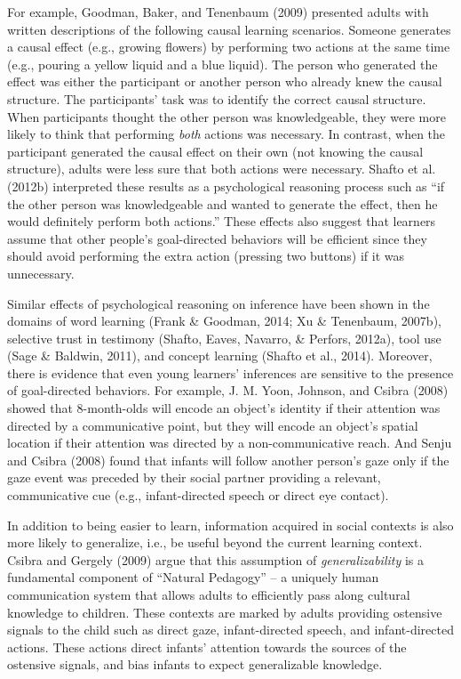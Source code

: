 \documentclass[english,floatsintext,man]{apa6}
\theoremstyle{definition}
\theoremstyle{definition}
\theoremstyle{definition}
\theoremstyle{remark}
\begin{document}
For example, Goodman, Baker, and Tenenbaum (2009) presented adults with
written descriptions of the following causal learning scenarios. Someone
generates a causal effect (e.g., growing flowers) by performing two
actions at the same time (e.g., pouring a yellow liquid and a blue
liquid). The person who generated the effect was either the participant
or another person who already knew the causal structure. The
participants' task was to identify the correct causal structure. When
participants thought the other person was knowledgeable, they were more
likely to think that performing \emph{both} actions was necessary. In
contrast, when the participant generated the causal effect on their own
(not knowing the causal structure), adults were less sure that both
actions were necessary. Shafto et al. (2012b) interpreted these results
as a psychological reasoning process such as \enquote{if the other
person was knowledgeable and wanted to generate the effect, then he
would definitely perform both actions.} These effects also suggest that
learners assume that other people's goal-directed behaviors will be
efficient since they should avoid performing the extra action (pressing
two buttons) if it was unnecessary.

Similar effects of psychological reasoning on inference have been shown
in the domains of word learning (Frank \& Goodman, 2014; Xu \&
Tenenbaum, 2007b), selective trust in testimony (Shafto, Eaves, Navarro,
\& Perfors, 2012a), tool use (Sage \& Baldwin, 2011), and concept
learning (Shafto et al., 2014). Moreover, there is evidence that even
young learners' inferences are sensitive to the presence of
goal-directed behaviors. For example, J. M. Yoon, Johnson, and Csibra
(2008) showed that 8-month-olds will encode an object's identity if
their attention was directed by a communicative point, but they will
encode an object's spatial location if their attention was directed by a
non-communicative reach. And Senju and Csibra (2008) found that infants
will follow another person's gaze only if the gaze event was preceded by
their social partner providing a relevant, communicative cue (e.g.,
infant-directed speech or direct eye contact).

In addition to being easier to learn, information acquired in social
contexts is also more likely to generalize, i.e., be useful beyond the
current learning context. Csibra and Gergely (2009) argue that this
assumption of \emph{generalizability} is a fundamental component of
\enquote{Natural Pedagogy} -- a uniquely human communication system that
allows adults to efficiently pass along cultural knowledge to children.
These contexts are marked by adults providing ostensive signals to the
child such as direct gaze, infant-directed speech, and infant-directed
actions. These actions direct infants' attention towards the sources of
the ostensive signals, and bias infants to expect generalizable
knowledge.
\end{document}
